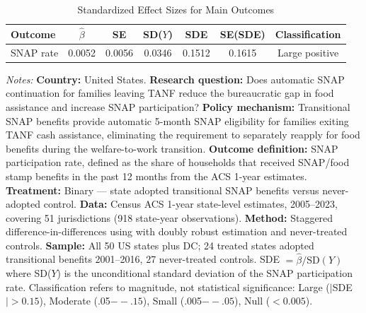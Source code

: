 
\begin{table}[H]
\centering
\caption{Standardized Effect Sizes for Main Outcomes}
\label{tab:sde}
\begin{threeparttable}
\begin{tabular}{lcccccc}
\toprule
Outcome & $\hat{\beta}$ & SE & SD($Y$) & SDE & SE(SDE) & Classification \\
\midrule
SNAP rate & 0.0052 & 0.0056 & 0.0346 & 0.1512 & 0.1615 & Large positive \\
\bottomrule
\end{tabular}
\begin{tablenotes}[flushleft]
\small
\item \textit{Notes:} \textbf{Country:} United States. \textbf{Research question:} Does automatic SNAP continuation for families leaving TANF reduce the bureaucratic gap in food assistance and increase SNAP participation? \textbf{Policy mechanism:} Transitional SNAP benefits provide automatic 5-month SNAP eligibility for families exiting TANF cash assistance, eliminating the requirement to separately reapply for food benefits during the welfare-to-work transition. \textbf{Outcome definition:} SNAP participation rate, defined as the share of households that received SNAP/food stamp benefits in the past 12 months from the ACS 1-year estimates. \textbf{Treatment:} Binary --- state adopted transitional SNAP benefits versus never-adopted control. \textbf{Data:} Census ACS 1-year state-level estimates, 2005--2023, covering 51 jurisdictions (918 state-year observations). \textbf{Method:} Staggered difference-in-differences using \citet{callaway2021difference} with doubly robust estimation and never-treated controls. \textbf{Sample:} All 50 US states plus DC; 24 treated states adopted transitional benefits 2001--2016, 27 never-treated controls. SDE $= \hat{\beta} / \text{SD}(Y)$ where SD($Y$) is the unconditional standard deviation of the SNAP participation rate. Classification refers to magnitude, not statistical significance: Large ($|$SDE$| > 0.15$), Moderate (.05$--.15$), Small (.005$--.05$), Null ($< 0.005$).
\end{tablenotes}
\end{threeparttable}
\end{table}
